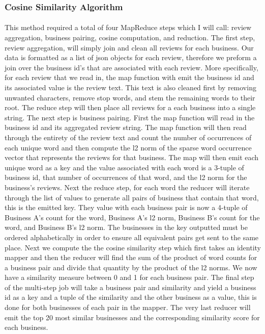 \documentclass[paper=letter, fontsize=15pt]{article} %
\begin{document}
\subsubsection{Cosine Similarity Algorithm}
\paragraph{}This method required a total of four MapReduce steps which I will call: review aggregation, business pairing, cosine computation, and reduction. The first step, review aggregation, will simply join and clean all reviews for each business. Our data is formatted as a list of json objects for each review, therefore we preform a join over the business id's that are associated with each review. More specifically, for each review that we read in, the map function with emit the business id and its associated value is the review text. This text is also cleaned first by removing unwanted characters, remove stop words, and stem the remaining words to their root. The reduce step will then place all reviews for a each business into a single string. The next step is business pairing. First the map function will read in the business id and its aggregated review string. The map function will then read through the entirety of the review text and count the number of occurrences of each unique word and then compute the l2 norm of the sparse word occurrence vector that represents the reviews for that business.  The map will then emit each unique word as a key and the value associated with each word is a 3-tuple of business id, that number of occurrences of that word, and the l2 norm for the business's reviews. Next the reduce step, for each word the reducer will iterate through the list of values to generate all pairs of business that contain that word, this is the emitted key. They value with each business pair is now a 4-tuple of Business A's count for the word, Business A's l2 norm, Business B's count for the word, and Business B's l2 norm. The businesses in the key outputted must be ordered alphabetically in order to ensure all equivalent pairs get sent to the same place. Next we compute the the cosine similarity step which first takes an identity mapper and then the reducer will find the sum of the product of word counts for a business pair and divide that quantity by the product of the l2 norms. We now have a similarity measure between 0 and 1 for each business pair. The final step of the multi-step job will take a business pair and similarity and yield a business id as a key and a tuple of the similarity and the other business as a value, this is done for both businesses of each pair in the mapper. The very last reducer will emit the top 20 most similar businesses and the corresponding similarity score for each business. 
\end{document}
